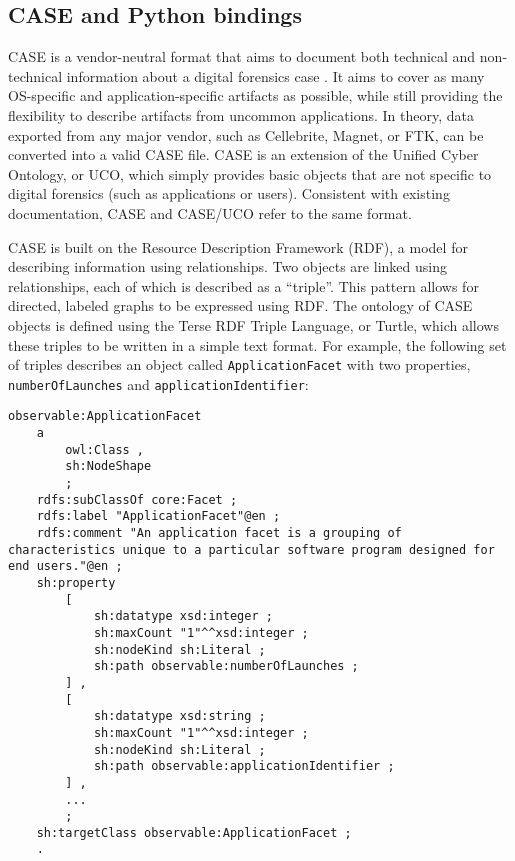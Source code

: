 \documentclass[letterpaper,12pt]{report}
\newcommand{\passthrough}[1]{#1}
\begin{document}
\subsection{CASE and Python
bindings}\label{case-and-python-bindings}

CASE is a vendor-neutral format that aims to document both technical and
non-technical information about a digital forensics case
\cite{caseyAdvancingCoordinatedCyberinvestigations2017}. It aims to
cover as many OS-specific and application-specific artifacts as
possible, while still providing the flexibility to describe artifacts
from uncommon applications. In theory, data exported from any major
vendor, such as Cellebrite, Magnet, or FTK, can be converted into a
valid CASE file. CASE is an extension of the Unified Cyber Ontology, or
UCO, which simply provides basic objects that are not specific to
digital forensics (such as applications or users). Consistent with
existing documentation, CASE and CASE/UCO refer to the same format.

CASE is built on the Resource Description Framework (RDF), a model for
describing information using relationships. Two objects are linked using
relationships, each of which is described as a ``triple''. This pattern
allows for directed, labeled graphs to be expressed using RDF. The
ontology of CASE objects is defined using the Terse RDF Triple Language,
or Turtle, which allows these triples to be written in a simple text
format. For example, the following set of triples describes an object
called \passthrough{\lstinline!ApplicationFacet!} with two properties,
\passthrough{\lstinline!numberOfLaunches!} and
\passthrough{\lstinline!applicationIdentifier!}:

\begin{lstlisting}
observable:ApplicationFacet
    a
        owl:Class ,
        sh:NodeShape
        ;
    rdfs:subClassOf core:Facet ;
    rdfs:label "ApplicationFacet"@en ;
    rdfs:comment "An application facet is a grouping of characteristics unique to a particular software program designed for end users."@en ;
    sh:property
        [
            sh:datatype xsd:integer ;
            sh:maxCount "1"^^xsd:integer ;
            sh:nodeKind sh:Literal ;
            sh:path observable:numberOfLaunches ;
        ] ,
        [
            sh:datatype xsd:string ;
            sh:maxCount "1"^^xsd:integer ;
            sh:nodeKind sh:Literal ;
            sh:path observable:applicationIdentifier ;
        ] ,
        ...
        ;
    sh:targetClass observable:ApplicationFacet ;
    .
\end{lstlisting}
\end{document}
